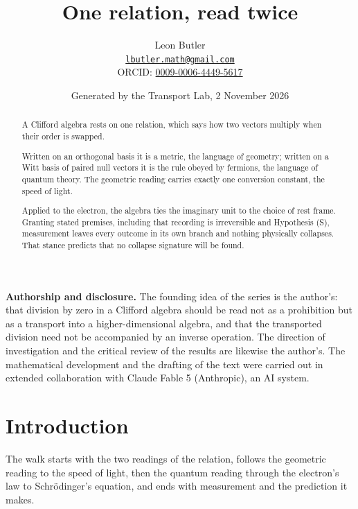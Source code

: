 \documentclass[11pt]{article}
\title{\bfseries One relation, read twice}
\author{Leon Butler\\ \normalsize\href{mailto:lbutler.math@gmail.com}{\texttt{lbutler.math@gmail.com}}\\ \normalsize ORCID: \href{https://orcid.org/0009-0006-4449-5617}{0009-0006-4449-5617}}
\date{Generated by the Transport Lab, 2 November 2026}
\theoremstyle{definition}
\theoremstyle{plain}
\begin{document}
\maketitle
\begin{abstract}
\normalsize
A Clifford algebra rests on one relation, which says how two vectors multiply when their order is swapped.

Written on an orthogonal basis it is a metric, the language of geometry; written on a Witt basis of paired null vectors it is the rule obeyed by fermions, the language of quantum theory. The geometric reading carries exactly one conversion constant, the speed of light.

Applied to the electron, the algebra ties the imaginary unit to the choice of rest frame. Granting stated premises, including that recording is irreversible and Hypothesis (S), measurement leaves every outcome in its own branch and nothing physically collapses. That stance predicts that no collapse signature will be found.
\end{abstract}
\newpage
\noindent \textbf{Authorship and disclosure. }The founding idea of the series is the author's: that division by zero in a Clifford algebra should be read not as a prohibition but as a transport into a higher-dimensional algebra, and that the transported division need not be accompanied by an inverse operation. The direction of investigation and the critical review of the results are likewise the author's. The mathematical development and the drafting of the text were carried out in extended collaboration with Claude Fable 5 (Anthropic), an AI system.

\noindent{}
\newpage

\section*{Introduction}
The walk starts with the two readings of the relation, follows the geometric reading to the speed of light, then the quantum reading through the electron's law to Schrödinger's equation, and ends with measurement and the prediction it makes.
\end{document}
